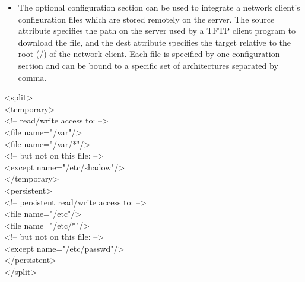 \begin {itemize}
      In this case, KIWI creates an additional write partition, then
      combines both partitions with the given overlay filesystem.
      Currently, there are two such filesystems: unionfs and aufs
      (aufs is the preferred file system). The partition that holds the
      read-only system image must be set as the ro attribute value, and the
      partition that serves as the write partition must be set the rw
      attribute value.
\item The optional configuration section can be used to integrate a network
      client's configuration files which are stored remotely on the server.
      The source attribute specifies the path on the server used by a
      TFTP client program to download the file, and the dest attribute
      specifies the target relative to the root (/) of the network client.
      Each file is specified by one configuration section and can be
      bound to a specific set of architectures separated by comma.
\end{itemize}

\newpage

\begin{Command}{12cm}
<split>\\
\hspace*{1cm}<temporary>\\
\hspace*{2cm}<!-- read/write access to: -->\\
\hspace*{2cm}<file name="/var"/>\\
\hspace*{2cm}<file name="/var/*"/>\\
\hspace*{2cm}<!-- but not on this file: -->\\
\hspace*{2cm}<except name="/etc/shadow"/>\\
\hspace*{1cm}</temporary>\\
\hspace*{1cm}<persistent>\\
\hspace*{2cm}<!-- persistent read/write access to: -->\\
\hspace*{2cm}<file name="/etc"/>\\
\hspace*{2cm}<file name="/etc/*"/>\\
\hspace*{2cm}<!-- but not on this file: -->\\
\hspace*{2cm}<except name="/etc/passwd"/>\\
\hspace*{1cm}</persistent>\\
</split>
\end{Command}

